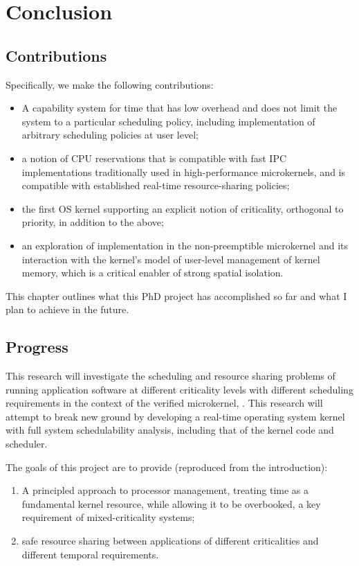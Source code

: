 \chapter{Conclusion}
\label{chap:conclusion}

\section{Contributions}

Specifically, we make the following contributions:
\begin{itemize}
\item A capability system for time that has low overhead and does not
  limit the system to a particular scheduling policy, including
  implementation of arbitrary scheduling policies at user level;
\item a notion of CPU reservations that is compatible with
  fast IPC implementations traditionally used in high-performance
  microkernels, and is compatible with established real-time resource-sharing policies;
\item the first OS kernel supporting an explicit notion of
  criticality, orthogonal to priority, in addition to the above;
\item an exploration of implementation in the non-preemptible \selfour
  microkernel and its interaction with the kernel's model of
  user-level management of kernel memory, which is a critical enabler
  of strong spatial isolation.
\end{itemize}




This chapter outlines what this PhD project has accomplished so far and what I plan to achieve in the future.

\section{Progress}

This research will investigate the scheduling and resource sharing problems of running application software at different criticality levels with different scheduling requirements in the context of the verified microkernel, \selfour.
This research will attempt to break new ground by developing a real-time operating system kernel with full system schedulability analysis, including that of the kernel code and scheduler.

The goals of this project are to provide (reproduced from the introduction):

\begin{enumerate}[label=\textbf{G\arabic*}]
  \item \label{G1} A principled approach to processor management, treating time as a fundamental kernel resource, while allowing it to be overbooked, a key requirement of mixed-criticality systems;
  \item \label{G2} safe resource sharing between applications of different criticalities and different temporal requirements.
\end{enumerate}

